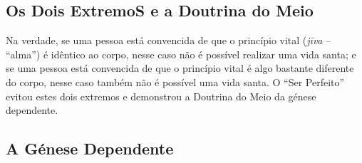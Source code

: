 
\subsection{Os Dois ExtremoS e a Doutrina do Meio}

Na verdade, se uma pessoa está convencida de que o princípio vital (\emph{jīva}
-- “alma”) é idêntico ao corpo, nesse caso não é possível realizar uma vida
santa; e se uma pessoa está convencida de que o princípio vital é algo bastante
diferente do corpo, nesse caso também não é possível uma vida santa. O “Ser
Perfeito” evitou estes dois extremos e demonstrou a Doutrina do Meio da génese
dependente.


\subsection{A Génese Dependente}


